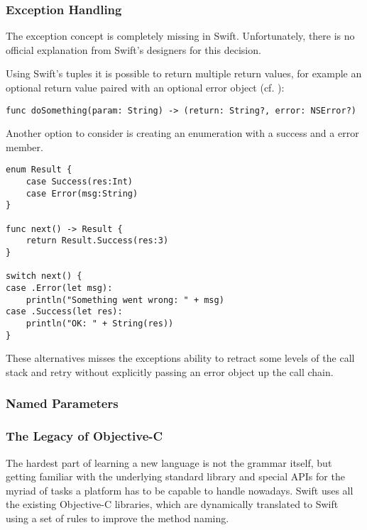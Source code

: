 \subsubsection{Exception Handling}

The exception concept is completely missing in Swift. Unfortunately, there is no official explanation from Swift's designers for this decision.

Using Swift's tuples it is possible to return multiple return values, for example an optional return value paired with an optional error object (cf. \cite{swift-error-handling}):
\begin{lstlisting}[frame=none]
func doSomething(param: String) -> (return: String?, error: NSError?)
\end{lstlisting}

Another option to consider is creating an enumeration with a success and a error member.

\begin{lstlisting}[frame=none]
enum Result {
    case Success(res:Int)
    case Error(msg:String)
}

func next() -> Result {
    return Result.Success(res:3)
}

switch next() {
case .Error(let msg):
    println("Something went wrong: " + msg)
case .Success(let res):
    println("OK: " + String(res))
}\end{lstlisting}

These alternatives misses the exceptions ability to retract some levels of the call stack and retry without explicitly passing an error object up the call chain.

\subsubsection{Named Parameters}

\subsubsection{The Legacy of Objective-C}

The hardest part of learning a new language is not the grammar itself, but getting familiar with the underlying standard library and special APIs for the myriad of tasks a platform has to be capable to handle nowadays.
Swift uses all the existing Objective-C libraries, which are dynamically translated to Swift using a set of rules to improve the method naming.


